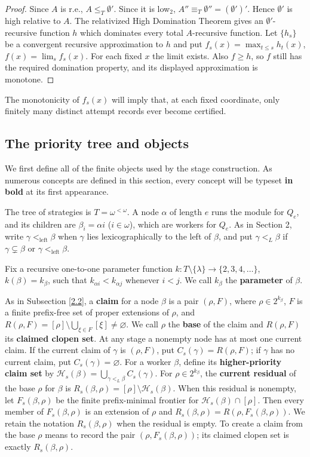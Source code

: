 \documentclass[11pt]{amsart}
\begin{document}
\begin{proof}
Since $A$ is r.e., $A\leq_T\emptyset'$. Since it is low$_2$, $A''\equiv_T\emptyset''=(\emptyset')'$.
Hence $\emptyset'$ is high relative to $A$. The relativized High Domination
Theorem gives an $\emptyset'$-recursive function $h$ which dominates every
total $A$-recursive function. Let $\{h_s\}$ be a convergent recursive
approximation to $h$ and put $f_s(x)=\max_{t\leq s}h_t(x)$,
$f(x)=\lim_s f_s(x)$. For each fixed $x$ the limit exists. Also $f\geq h$, so $f$ still has the
required domination property, and its displayed approximation is monotone.
\end{proof}

The monotonicity of $f_s(x)$ will imply that, at each fixed coordinate, only
finitely many distinct attempt records ever become certified.

\subsection{The priority tree and objects}

We first define all of the finite objects used by the stage construction. As numerous concepts are defined in this section, every concept will be typeset \textbf{in bold} at its first appearance.

The tree of strategies is $T=\omega^{<\omega}$. A node $\alpha$ of length
$e$ runs the module for $Q_e$, and its children are
$\beta_i=\alpha i$ ($i\in\omega$), which are workers for $Q_e$. As in Section 2, write
$\gamma<_{\mathrm{left}}\beta$ when $\gamma$ lies lexicographically to the
left of $\beta$, and put $\gamma<_L\beta$ if
$\gamma\subsetneq\beta$ or $\gamma<_{\mathrm{left}}\beta$.

Fix a recursive one-to-one parameter function $k:T\setminus\{\lambda\}\longrightarrow\{2,3,4,\ldots\}$, $k(\beta)=k_\beta$,
such that $k_{\alpha i}<k_{\alpha j}$ whenever $i<j$. We call $k_\beta$
the \textbf{parameter} of $\beta$.

As in Subsection \ref{2.2}, a \textbf{claim} for a node $\beta$ is a pair
$(\rho,F)$, where $\rho\in2^{k_\beta}$, $F$ is a finite prefix-free set of
proper extensions of $\rho$, and
$R(\rho,F)=[\rho]\setminus\bigcup_{\xi\in F}[\xi]\neq\varnothing$.
We call $\rho$ the \textbf{base} of the claim and $R(\rho,F)$ its
\textbf{claimed clopen set}. At any stage a nonempty node has at most one
current claim. If the current claim of $\gamma$ is $(\rho,F)$, put
$C_s(\gamma)=R(\rho,F)$; if $\gamma$ has no current claim, put
$C_s(\gamma)=\varnothing$. For a worker $\beta$, define its
\textbf{higher-priority claim set} by
$\mathcal H_s(\beta)=\bigcup_{\gamma<_L\beta}C_s(\gamma)$.
For $\rho\in2^{k_\beta}$, the \textbf{current residual} of the base $\rho$
for $\beta$ is $R_s(\beta,\rho)=[\rho]\setminus\mathcal H_s(\beta)$.
When this residual is nonempty, let $F_s(\beta,\rho)$ be the finite
prefix-minimal frontier for $\mathcal H_s(\beta)\cap[\rho]$. Then every member
of $F_s(\beta,\rho)$ is an extension of $\rho$ and $R_s(\beta,\rho)=R(\rho,F_s(\beta,\rho))$.
We retain the notation $R_s(\beta,\rho)$ when the residual is empty. To create
a claim from the base $\rho$ means to record the pair
$(\rho,F_s(\beta,\rho))$; its claimed clopen set is exactly
$R_s(\beta,\rho)$.
\end{document}

